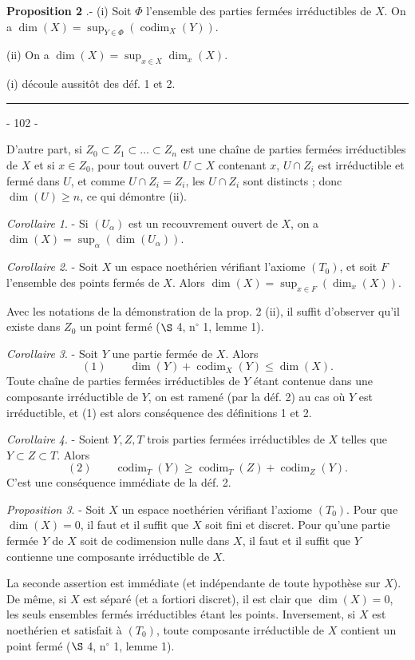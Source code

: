 \noindent \textbf{Proposition 2} .- (i) Soit $\Phi$ l'ensemble des parties fermées irréductibles de $X$. On a $\dim(X) = \sup_{Y \in \Phi} (\operatorname{codim}_X(Y))$.

\noindent (ii) On a $\dim(X) = \sup_{x \in X} \dim_x(X)$.

\noindent (i) découle aussitôt des déf. 1 et 2. \rule{4cm}{0.4pt}

\newpage


- 102 -

D'autre part, si $Z_0 \subset Z_1 \subset \dots \subset Z_n$ est une chaîne de parties fermées irréductibles de $X$ et si $x \in Z_0$, pour tout ouvert $U \subset X$ contenant $x$, $U \cap Z_i$ est irréductible et fermé dans $U$, et comme $U \cap Z_i = Z_i$, les $U \cap Z_i$ sont distincts ; donc $\dim(U) \ge n$, ce qui démontre (ii).

\emph{Corollaire 1}. - Si $(U_\alpha)$ est un recouvrement ouvert de $X$, on a $\dim(X) = \sup_{\alpha}(\dim(U_\alpha))$.

\emph{Corollaire 2}. - Soit $X$ un espace noethérien vérifiant l'axiome $(T_0)$, et soit $F$ l'ensemble des points fermés de $X$. Alors $\dim(X) = \sup_{x \in F}(\dim_x(X))$.

Avec les notations de la démonstration de la prop. 2 (ii), il suffit d'observer qu'il existe dans $Z_0$ un point fermé ($\S$ 4, n$^\circ$ 1, lemme 1).

\emph{Corollaire 3}. - Soit $Y$ une partie fermée de $X$. Alors
$$(1) \qquad \dim(Y) + \operatorname{codim}_X(Y) \le \dim(X).$$
Toute chaîne de parties fermées irréductibles de $Y$ étant contenue dans une composante irréductible de $Y$, on est ramené (par la déf. 2) au cas où $Y$ est irréductible, et (1) est alors conséquence des définitions 1 et 2.

\emph{Corollaire 4}. - Soient $Y, Z, T$ trois parties fermées irréductibles de $X$ telles que $Y \subset Z \subset T$. Alors
$$(2) \qquad \operatorname{codim}_T(Y) \ge \operatorname{codim}_T(Z) + \operatorname{codim}_Z(Y).$$
C'est une conséquence immédiate de la déf. 2.

\emph{Proposition 3}. - Soit $X$ un espace noethérien vérifiant l'axiome $(T_0)$. Pour que $\dim(X) = 0$, il faut et il suffit que $X$ soit fini et discret. Pour qu'une partie fermée $Y$ de $X$ soit de codimension nulle dans $X$, il faut et il suffit que $Y$ contienne une composante irréductible de $X$.

La seconde assertion est immédiate (et indépendante de toute hypothèse sur $X$). De même, si $X$ est séparé (et a fortiori discret), il est clair que $\dim(X) = 0$, les seuls ensembles fermés irréductibles étant les points. Inversement, si $X$ est noethérien et satisfait à $(T_0)$, toute composante irréductible de $X$ contient un point fermé ($\S$ 4, n$^\circ$ 1, lemme 1).

